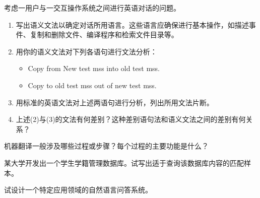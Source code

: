 \begin{question}
考虑一用户与一交互操作系统之间进行英语对话的问题。
	\begin{enumerate}
	\item 写出语义文法以确定对话所用语言。这些语言应确保进行基本操作，如描述事件、复制和删除文件、编译程序和检索文件目录等。
	\item 用你的语义文法对下列各语句进行文法分析：
		\begin{itemize}
		\item[] Copy from New test mss into old test mss. 
		\item[] Copy to old test mss out of new test mss. 
		\end{itemize}
	\item 用标准的英语文法对上述两语句进行分析，列出所用文法片断。
	\item 上述(2)与(3)的文法有何差别？这种差别语句法和语义文法之间的差别有何关系？
	\end{enumerate}
\end{question}
\begin{solution}
\end{solution}

\begin{question}
机器翻译一般涉及哪些过程或步骤？每个过程的主要功能是什么？
\end{question}
\begin{solution}
\end{solution}

\begin{question}
某大学开发出一个学生学籍管理数据库。试写出适于查询该数据库内容的匹配样本。
\end{question}
\begin{solution}
\end{solution}

\begin{question}
试设计一个特定应用领域的自然语言问答系统。
\end{question}
\begin{solution}
\end{solution}